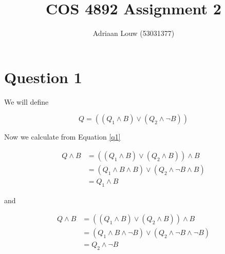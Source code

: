 \documentclass[10pt,a4paper]{article}
\title{COS 4892 Assignment 2}
\author{Adriaan Louw (53031377)}
\begin{document}
\maketitle

\section{Question 1}

We will define

\begin{equation}
\label{q1}
Q = ((Q_1 \wedge B) \vee (Q_2 \wedge \neg B))
\end{equation}

Now we calculate from Equation \ref{q1}

\begin{equation}
\begin{split}
 Q\wedge B &= ((Q_1\wedge B)\vee(Q_2\wedge B))\wedge B\\
 &= (Q_1\wedge B \wedge B)\vee (Q_2\wedge \neg B \wedge B)\\
 &= Q_1\wedge B
 \end{split}
\end{equation}

and

\begin{equation}
\begin{split}
 Q\wedge B &= ((Q_1\wedge B)\vee(Q_2\wedge B))\wedge B\\
 &= (Q_1\wedge B \wedge \neg B)\vee (Q_2\wedge \neg B \wedge \neg B)\\
 &= Q_2\wedge \neg B
 \end{split}
\end{equation}
\end{document}
